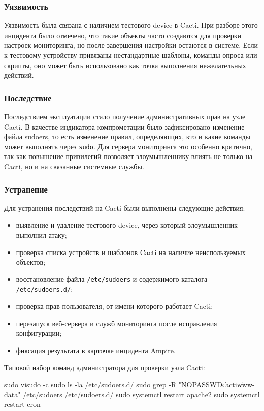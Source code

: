 \documentclass[14pt]{extarticle}
\begin{document}
\subsubsection*{Уязвимость}

Уязвимость была связана с наличием тестового device в Cacti. При разборе этого инцидента было отмечено, что такие объекты часто создаются для проверки настроек мониторинга, но после завершения настройки остаются в системе. Если к тестовому устройству привязаны нестандартные шаблоны, команды опроса или скрипты, оно может быть использовано как точка выполнения нежелательных действий.

\subsubsection*{Последствие}

Последствием эксплуатации стало получение административных прав на узле Cacti. В качестве индикатора компрометации было зафиксировано изменение файла sudoers, то есть изменение правил, определяющих, кто и какие команды может выполнять через \texttt{sudo}. Для сервера мониторинга это особенно критично, так как повышение привилегий позволяет злоумышленнику влиять не только на Cacti, но и на связанные системные службы.

\subsubsection*{Устранение}

Для устранения последствий на Cacti были выполнены следующие действия:
\begin{itemize}
  \item выявление и удаление тестового device, через который злоумышленник выполнил атаку;
  \item проверка списка устройств и шаблонов Cacti на наличие неиспользуемых объектов;
  \item восстановление файла \texttt{/etc/sudoers} и содержимого каталога \texttt{/etc/sudoers.d/};
  \item проверка прав пользователя, от имени которого работает Cacti;
  \item перезапуск веб-сервера и служб мониторинга после исправления конфигурации;
  \item фиксация результата в карточке инцидента Ampire.
\end{itemize}

Типовой набор команд администратора для проверки узла Cacti:
\begin{CodeBlock}
sudo visudo -c
sudo ls -la /etc/sudoers.d/
sudo grep -R "NOPASSWD\|cacti\|www-data" /etc/sudoers /etc/sudoers.d/
sudo systemctl restart apache2
sudo systemctl restart cron
\end{CodeBlock}
\end{document}
